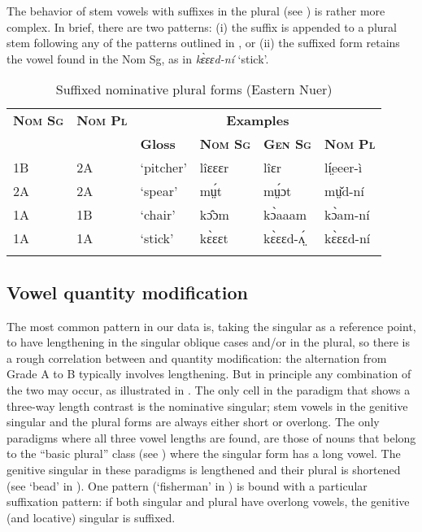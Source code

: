 \documentclass[output=paper,newtxmath,modfonts,nonflat,draftmode]{langsci/langscibook}
\begin{document}
The behavior of stem vowels with suffixes in the  plural (see ) is rather more complex. In brief, there are two patterns: (i) the suffix is appended to a plural stem following any of the patterns outlined in , or (ii) the suffixed form retains the vowel found in the Nom Sg, as in \textit{kɛ̀ɛɛd-ní} ‘stick’.


\begin{table}
\begin{tabularx}{\textwidth}{ll XXXX}
\lsptoprule

\bfseries\scshape Nom Sg & \bfseries\scshape Nom Pl & \multicolumn{4}{c}{\bfseries Examples}\\
\cmidrule{3-6}
&  & \bfseries Gloss & \bfseries\scshape Nom Sg & \bfseries\scshape Gen Sg & \bfseries\scshape Nom Pl\\
\midrule
1B & 2A & ‘pitcher’ & lîɛɛɛr & lîɛr & lí̤eeer-ì\\
2A & 2A & ‘spear’ & mṳ́t & mṳ́ɔt & mṳ̌d-ní\\
1A & 1B & ‘chair’ & kɔ̂ɔm & kɔ̀aaam & kɔ̀am-ní\\
1A & 1A & ‘stick’ & kɛ̀ɛɛt & kɛ̀ɛɛd-ʌ̤́ & kɛ̀ɛɛd-ní\\
\lspbottomrule
\end{tabularx}
\caption{Suffixed nominative plural forms (Eastern Nuer)}
\label{tab:monich:19}
\end{table}

\subsection{Vowel quantity modification} %

The most common pattern in our data is, taking the  singular as a reference point, to have lengthening in the singular oblique cases and/or in the plural, so there is a rough correlation between  and quantity modification: the alternation from Grade A to B typically involves lengthening. But in principle any combination of the two may occur, as illustrated in . The only cell in the paradigm that shows a three-way length contrast is the nominative singular; stem vowels in the genitive singular and the  plural forms are always either short or overlong. The only paradigms where all three vowel lengths are found, are those of nouns that belong to the “basic plural” class (see ) where the  singular form has a long vowel. The genitive singular in these paradigms is lengthened and their  plural is shortened (see ‘bead’ in ). One pattern (‘fisherman’ in ) is bound with a particular suffixation pattern:  if both  singular and plural have overlong vowels, the genitive (and locative) singular is suffixed. 
\end{document}
